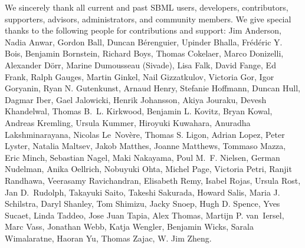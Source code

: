 \documentclass{sbml-paper}
\begin{document}
We sincerely thank all current and past SBML users, developers, contributors, supporters, advisors, administrators, and community members.  We give special thanks to the following people for contributions and support:
Jim Anderson,
Nadia Anwar,
Gordon Ball,
Duncan B\'{e}renguier,
Upinder Bhalla,
Fr\'{e}d\'{e}ric Y. Bois,
Benjamin Bornstein,
Richard Boys,
Thomas Cokelaer,
Marco Donizelli,
Alexander D\"{o}rr,
Marine Dumousseau (Sivade),
Lisa Falk,
David Fange,
Ed Frank,
Ralph Gauges,
Martin Ginkel,
Nail Gizzatkulov,
Victoria Gor,
Igor Goryanin,
Ryan N. Gutenkunst,
Arnaud Henry,
Stefanie Hoffmann,
Duncan Hull,
Dagmar Iber,
Gael Jalowicki,
Henrik Johansson,
Akiya Jouraku,
Devesh Khandelwal,
Thomas B.~L. Kirkwood,
Benjamin L. Kovitz,
Bryan Kowal,
Andreas Kremling,
Ursula Kummer,
Hiroyuki Kuwahara,
Anuradha Lakshminarayana,
Nicolas Le~Nov\`{e}re,
Thomas S. Ligon,
Adrian Lopez,
Peter Lyster,
Natalia Maltsev,
Jakob Matthes,
Joanne Matthews,
Tommaso Mazza,
Eric Minch,
Sebastian Nagel,
Maki Nakayama,
Poul M.~F. Nielsen,
German Nudelman,
Anika Oellrich,
Nobuyuki Ohta,
Michel Page,
Victoria Petri,
Ranjit Randhawa,
Veerasamy Ravichandran,
Elisabeth Remy,
Isabel Rojas,
Ursula Rost,
Jan D.~Rudolph,
Takayuki Saito,
Takeshi Sakurada,
Howard Salis,
Maria J. Schilstra,
Daryl Shanley,
Tom Shimizu,
Jacky Snoep,
Hugh D. Spence,
Yves Sucaet,
Linda Taddeo,
Jose Juan Tapia,
Alex Thomas,
Martijn P. van~Iersel,
Marc Vass,
Jonathan Webb,
Katja Wengler,
Benjamin Wicks,
Sarala Wimalaratne,
Haoran Yu,
Thomas Zajac,
W. Jim Zheng.
\end{document}
